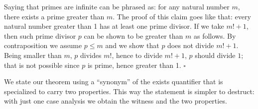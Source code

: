 Saying that primes are infinite can be phrased as: for any natural number
$m$, there exists a prime greater than $m$.  The proof of this claim goes like
that: every natural number greater than 1 has at least one prime divisor.  If
we take $m! + 1$, then such prime divisor $p$ can be shown to be greater than $m$ as
follows.  By contraposition we assume $p \leq m$ and we show that $p$
does not divide $m!+1$.
Being smaller than $m$, $p$ divides $m!$, hence to divide $m!+1$, $p$ should divide
$1$; that is not possible since $p$ is prime, hence greater than 1.
\hfill$\square$



% 
% 
% 
% 
% 
% 

We state our theorem using a
``synonym'' of the exists quantifier that is specialized to carry two
properties.  This way the statement is simpler to destruct: with just one
case analysis we obtain the witness and the two properties.

